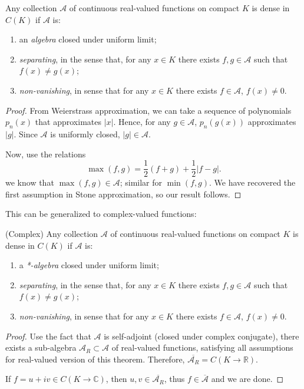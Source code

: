 \begin{theorem}
	Any collection $\mathcal{A}$ of continuous real-valued functions on compact $K$ is dense in $C(K)$ if $\mathcal{A}$ is:
	\begin{enumerate}
		\item an \textit{algebra} closed under uniform limit;
		\item \textit{separating}, in the sense that, for any $x\in K$ there exists $f, g \in \mathcal{A}$ such that $f(x) \neq g(x)$;
		\item \textit{non-vanishing}, in sense that for any $x \in K$ there exists $f \in \mathcal{A}$, $f(x) \neq 0$.
	\end{enumerate}
\end{theorem}
\begin{proof}
	From Weierstrass approximation, we can take a sequence of polynomials  $p_n(x)$ that approximates $|x|$. Hence, for any $g \in \mathcal{A}$, $p_n(g(x))$ approximates $|g|$. Since $\mathcal{A}$ is uniformly closed, $|g| \in \mathcal{A}$. 

	Now, use the relations
	\[
		\max(f, g) = \frac{1}{2}(f + g) + \frac{1}{2}\left| f - g \right| 
	.\] 
	we know that $\max(f, g) \in \mathcal{A}$; similar for $\min(f, g)$. We have recovered the first assumption in Stone approximation, so our result follows.
\end{proof}
 
This can be generalized to complex-valued functions:

\begin{theorem}
	(Complex)
	Any collection $\mathcal{A}$ of continuous real-valued functions on compact $K$ is dense in $C(K)$ if $\mathcal{A}$ is:
	\begin{enumerate}
		\item a \textit{*-algebra} closed under uniform limit;
		\item \textit{separating}, in the sense that, for any $x\in K$ there exists $f, g \in \mathcal{A}$ such that $f(x) \neq g(x)$;
		\item \textit{non-vanishing}, in sense that for any $x \in K$ there exists $f \in \mathcal{A}$, $f(x) \neq 0$.
	\end{enumerate}
\end{theorem}
\begin{proof}
	Use the fact that $\mathcal{A}$ is self-adjoint (closed under complex conjugate), there exists a sub-algebra $\mathcal{A}_R \subset \mathcal{A}$ of real-valued functions, satisfying all assumptions for real-valued version of this theorem. Therefore, $\overline{\mathcal{A}_R} = C(K \to \mathbb{R})$.

	If $f = u + i v \in C(K \to \mathbb{C})$, then $u, v \in \overline{\mathcal{A}_R}$, thus $f \in \overline{\mathcal{A}} $ and we are done.
\end{proof}


